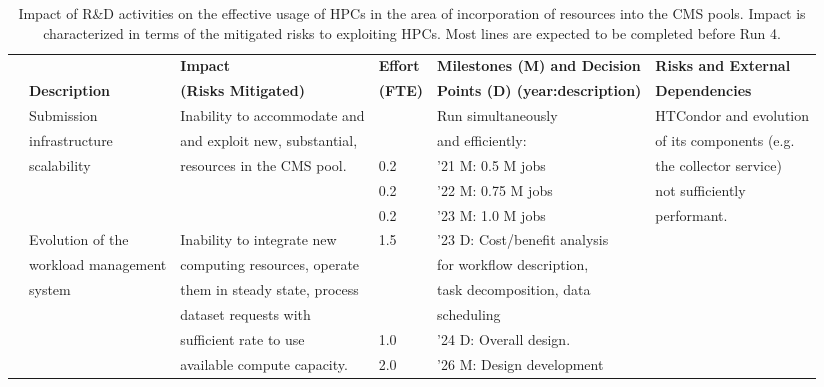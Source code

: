 \documentclass{cmspaper}
\newcommand{\trh}{\cellcolor{tablerowheader}}
\newcounter{magicrownumbers}
\newcommand\rownumber{\refstepcounter{magicrownumbers}\arabic{magicrownumbers}}
\newcommand{\B}[1]{\textbf{#1}}
\newcommand{\UP}[1]{\multirow{-2}{*}{\B{#1}}}
\begin{document}
\begin{table}[ht]
{\footnotesize
\begin{center}
\caption{Impact of R\&D activities on the effective usage of HPCs in the area of incorporation of resources into the CMS pools. Impact is characterized in terms of the mitigated risks to exploiting HPCs. Most lines are expected to be completed before Run 4.}
\label{tab:hpc}
\begin{tabular}{llllll} 
\rowcolor{tableheader} &                  & \B{Impact}            & \B{Effort} & \B{Milestones (M) and Decision}  & \B{Risks and External} \\
\rowcolor{tableheader} & \UP{Description} & \B{(Risks Mitigated)} & \B{(FTE)} & \B{Points (D) (year:description)} & \B{Dependencies}       \\
\hline\hline
\rownumber
\trh &\trh Submission          & Inability to accommodate and  &     & Run simultaneously & HTCondor and evolution    \\ 
\trh &\trh infrastructure      & and exploit new, substantial, &     & and efficiently:   & of its components (e.g.   \\
\trh &\trh scalability         & resources in the CMS pool.    & 0.2 & '21 M: 0.5 M jobs  & the collector service)    \\
\trh &\trh                     &                               & 0.2 & '22 M: 0.75 M jobs & not sufficiently          \\
\trh &\trh                     &                               & 0.2 & '23 M: 1.0 M jobs  & performant.               \\ 
\hline
\rownumber
\trh &\trh Evolution of the    & Inability to integrate new    & 1.5 & '23 D: Cost/benefit analysis  & \\
\trh &\trh workload management & computing resources, operate  &     & for workflow description,     & \\
\trh &\trh system              & them in steady state, process &     & task decomposition, data      & \\
\trh &\trh                     & dataset requests with         &     & scheduling                    & \\
\trh &\trh                     & sufficient rate to use        & 1.0 & '24 D: Overall design.        & \\
\trh &\trh                     & available compute capacity.   & 2.0 & '26 M: Design development     & \\

\end{tabular}
\end{center}}
\end{table}
\end{document}
